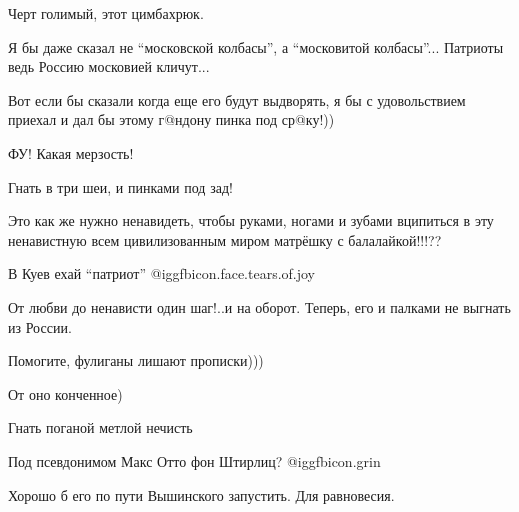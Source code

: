 \begin{itemize}
Черт голимый, этот цимбахрюк.

Я бы даже сказал не \enquote{московской колбасы}, а \enquote{московитой колбасы}... Патриоты ведь Россию московией кличут...

Вот если бы сказали когда еще его будут выдворять, я бы с удовольствием приехал и дал бы этому г@ндону пинка под ср@ку!))

ФУ! Какая мерзость!

Гнать в три шеи, и пинками под зад!

Это как же нужно ненавидеть, чтобы руками, ногами и зубами вципиться в эту ненавистную всем цивилизованным миром матрёшку с балалайкой!!!??

В Куев ехай \enquote{патриот}  @igg{fbicon.face.tears.of.joy} 

От любви до ненависти один шаг!..и на оборот.
Теперь, его и палками не выгнать из России.

Помогите, фулиганы лишают прописки)))

От оно конченное)

Гнать поганой метлой нечисть

Под псевдонимом Макс Отто фон Штирлиц?  @igg{fbicon.grin} 

Хорошо б его по пути Вышинского запустить. Для равновесия.


\end{itemize} %
